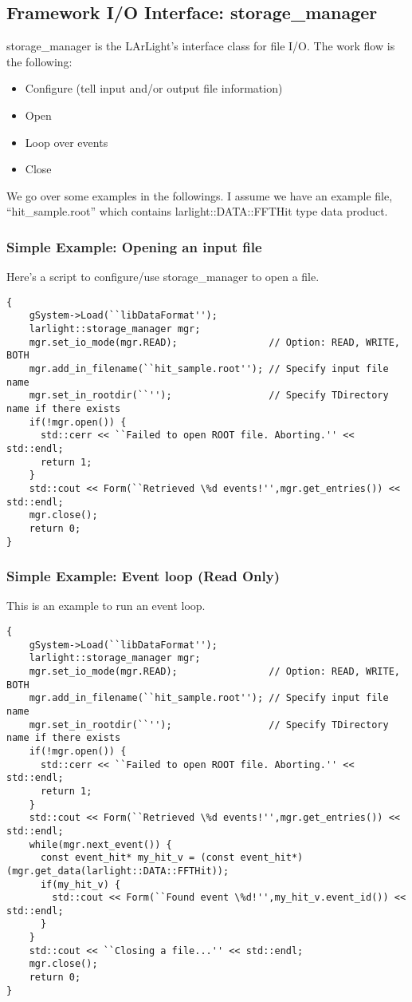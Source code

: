 \subsection{Framework I/O Interface: {\ttfamily storage\_manager}}

{\ttfamily storage\_manager} is the LArLight's \CPP interface class for \ROOT file I/O.
The work flow is the following:
\begin{itemize}
\item Configure (tell input and/or output file information)
\item Open
\item Loop over events
\item Close
\end{itemize}

We go over some examples in the followings. I assume we have an example file, ``hit\_sample.root''
which contains {\ttfamily larlight::DATA::FFTHit} type data product.

\subsubsection{Simple Example: Opening an input file}
Here's a \CINT script to configure/use {\ttfamily storage\_manager} to open a \ROOT file.
\begin{lstlisting}
{
    gSystem->Load(``libDataFormat'');
    larlight::storage_manager mgr;
    mgr.set_io_mode(mgr.READ);                // Option: READ, WRITE, BOTH
    mgr.add_in_filename(``hit_sample.root''); // Specify input file name
    mgr.set_in_rootdir(``'');                 // Specify TDirectory name if there exists
    if(!mgr.open()) {
      std::cerr << ``Failed to open ROOT file. Aborting.'' << std::endl;
      return 1;
    }
    std::cout << Form(``Retrieved \%d events!'',mgr.get_entries()) << std::endl;
    mgr.close();
    return 0;
}
\end{lstlisting}


\subsubsection{Simple Example: Event loop (Read Only)}
This is an example to run an event loop.
\begin{lstlisting}
{
    gSystem->Load(``libDataFormat'');
    larlight::storage_manager mgr;
    mgr.set_io_mode(mgr.READ);                // Option: READ, WRITE, BOTH
    mgr.add_in_filename(``hit_sample.root''); // Specify input file name
    mgr.set_in_rootdir(``'');                 // Specify TDirectory name if there exists
    if(!mgr.open()) {
      std::cerr << ``Failed to open ROOT file. Aborting.'' << std::endl;
      return 1;
    }
    std::cout << Form(``Retrieved \%d events!'',mgr.get_entries()) << std::endl;
    while(mgr.next_event()) {
      const event_hit* my_hit_v = (const event_hit*)(mgr.get_data(larlight::DATA::FFTHit));
      if(my_hit_v) {
        std::cout << Form(``Found event \%d!'',my_hit_v.event_id()) << std::endl;
      }
    }
    std::cout << ``Closing a file...'' << std::endl;
    mgr.close();
    return 0;
}
\end{lstlisting}

